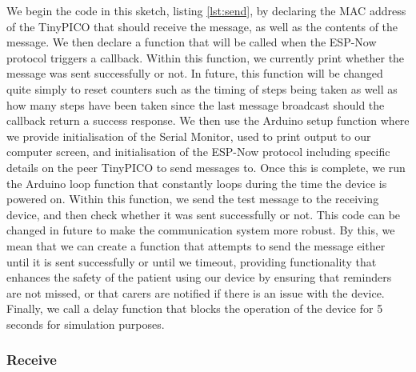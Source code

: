 {We begin the code in this sketch, listing \ref{lst:send}, by declaring the MAC address of the TinyPICO that should receive the message, as well as the contents of the message. We then declare a function that will be called when the ESP-Now protocol triggers a callback. Within this function, we currently print whether the message was sent successfully or not. In future, this function will be changed quite simply to reset counters such as the timing of steps being taken as well as how many steps have been taken since the last message broadcast should the callback return a success response. We then use the Arduino setup function where we provide initialisation of the Serial Monitor, used to print output to our computer screen, and initialisation of the ESP-Now protocol including specific details on the peer TinyPICO to send messages to. Once this is complete, we run the Arduino loop function that constantly loops during the time the device is powered on. Within this function, we send the test message to the receiving device, and then check whether it was sent successfully or not. This code can be changed in future to make the communication system more robust. By this, we mean that we can create a function that attempts to send the message either until it is sent successfully or until we timeout, providing functionality that enhances the safety of the patient using our device by ensuring that reminders are not missed, or that carers are notified if there is an issue with the device. Finally, we call a delay function that blocks the operation of the device for 5 seconds for simulation purposes.

\subsubsection{Receive}



}

